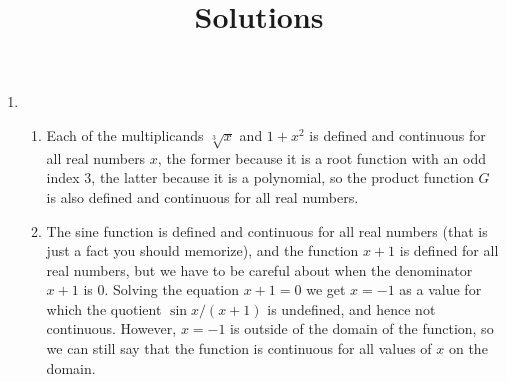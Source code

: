 \documentclass{article}
\title{\commonPSTitleZeroOneEight\ Solutions}
\author{\commonAuthor}
\date{\commonDateZeroOneEight}
\begin{document}
\maketitle
\begin{enumerate}
\item %
  \begin{enumerate}
  \item %
    Each of the multiplicands $\sqrt[3]{x}$ and $1+x^2$ is defined and
    continuous for all real numbers $x$, the former because it is a
    root function with an odd index $3$, the latter because it is a
    polynomial, so the product function $G$ is also defined and
    continuous for all real numbers.
  \item %
    The sine function is defined and continuous for all real numbers
    (that is just a fact you should memorize), and the function $x+1$
    is defined for all real numbers, but we have to be careful about
    when the denominator $x+1$ is $0$.  Solving the equation $x+1=0$
    we get $x=-1$ as a value for which the quotient $\sin x/(x+1)$ is
    undefined, and hence not continuous.  However, $x=-1$ is outside
    of the domain of the function, so we can still say that the
    function is continuous for all values of $x$ on the domain.

\end{enumerate}
\end{enumerate}
\end{document}
